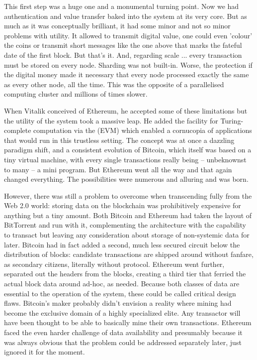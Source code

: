 This first step was a huge one and a monumental turning point. Now we had authentication and value transfer baked into the system at its very core. But as much as it was conceptually brilliant, it had some minor and not so minor problems with utility. It allowed to transmit digital value, one could even 'colour' the coins or transmit short messages like the one above that marks the fateful date of the first block. But that's it. And, regarding scale ... every transaction must be stored on every node. Sharding was not built-in. Worse, the protection if the digital money made it necessary that every node processed exactly the same as every other node, all the time. This was the opposite of a parallelised computing cluster and millions of times slower.

When Vitalik conceived of Ethereum, he accepted some of these limitations but the utility of the system took a massive leap. He added the facility for Turing-complete computation via the  (EVM) which enabled a cornucopia of applications that would run in this trustless setting. The concept was at once a dazzling paradigm shift, and a consistent evolution of Bitcoin, which itself was based on a tiny virtual machine, with every single transactions really being – unbeknownst to many – a mini program. But Ethereum went all the way and that again changed everything. The possibilities were numerous and alluring and  was born.

However, there was still a problem to overcome when transcending fully from the Web 2.0 world: storing data on the blockchain was prohibitively expensive for anything but a tiny amount. Both Bitcoin and Ethereum had taken the layout of BitTorrent and run with it, complementing the architecture with the capability to transact but leaving any consideration about storage of non-systemic data for later. Bitcoin had in fact added a second, much less secured circuit below the distribution of blocks: candidate transactions are shipped around without fanfare, as secondary citizens, literally without protocol. Ethereum went further, separated out the headers from the blocks, creating a third tier that ferried the actual block data around ad-hoc, as needed. Because both classes of data are essential to the operation of the system, these could be called critical design flaws. Bitcoin's maker probably didn't envision a reality where mining had become the exclusive domain of a highly specialized elite. Any transactor will have been thought to be able to basically mine their own transactions. Ethereum faced the even harder challenge of data availability and presumably because it was always obvious that the problem could be addressed separately later, just ignored it for the moment. 

